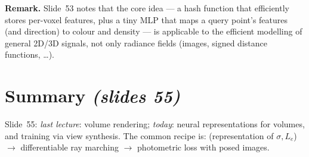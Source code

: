 \documentclass[11pt,a4paper]{article}
\newcommand{\sref}[1]{\texorpdfstring{\emph{(slides #1)}}{(slides #1)}}
\newcommand{\Le}{L_e}
\theoremstyle{definition}
\theoremstyle{plain}
\theoremstyle{remark}
\begin{document}

\textbf{Remark.} Slide~53 notes that the core idea --- a hash function that efficiently stores per-voxel features, plus a tiny MLP that maps a query point's features (and direction) to colour and density --- is applicable to the efficient modelling of general 2D/3D signals, not only radiance fields (images, signed distance functions, \dots).

\section{Summary \sref{55}}

Slide~55: \emph{last lecture}: volume rendering; \emph{today}: neural representations for volumes, and training via view synthesis. The common recipe is: (representation of $\sigma,\Le$) $\to$ differentiable ray marching $\to$ photometric loss with posed images.

\end{document}
